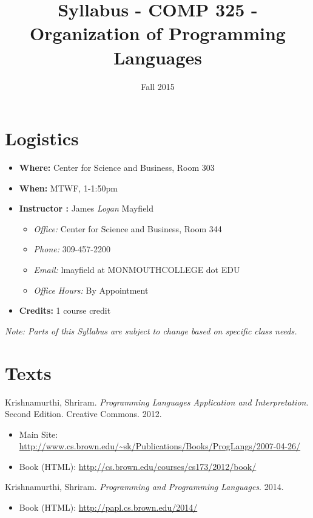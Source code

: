 \documentclass[10pt]{article}
\title{Syllabus - COMP 325 - Organization of Programming Languages}
\author{  }
\date{Fall 2015}
\begin{document}
\maketitle

\section{Logistics}
\begin{itemize}
\item \textbf{Where: } Center for Science and Business, Room 303
\item \textbf{When: } MTWF,  1-1:50pm
\item \textbf{Instructor :} James \textit{Logan} Mayfield
\begin{itemize}
\item \textit{Office: } Center for Science and Business, Room 344
\item \textit{Phone: } 309-457-2200
\item \textit{Email: } lmayfield at MONMOUTHCOLLEGE dot EDU
\item \textit{Office Hours: } By Appointment
\end{itemize}
\item \textbf{Credits: } 1 course credit
\end{itemize}
\emph{Note: Parts of this Syllabus are subject to change based on specific class needs.}

\section{Texts}

Krishnamurthi, Shriram. \textit{Programming Languages Application and Interpretation}. Second Edition. Creative Commons. 2012. 
\begin{itemize}
\item Main Site: \url{http://www.cs.brown.edu/~sk/Publications/Books/ProgLangs/2007-04-26/}
\item Book (HTML): \url{http://cs.brown.edu/courses/cs173/2012/book/}
\end{itemize}

\vspace{.2in} 

\noindent
Krishnamurthi, Shriram. \textit{Programming and Programming Languages}. 2014. 
\begin{itemize}
\item Book (HTML): \url{http://papl.cs.brown.edu/2014/}
\end{itemize}
\end{document}
